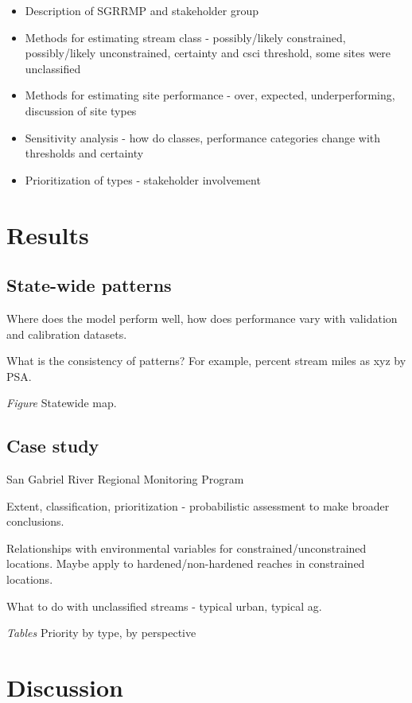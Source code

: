 \documentclass[]{article}
\begin{document}
\begin{itemize}
\item
  Description of SGRRMP and stakeholder group
\item
  Methods for estimating stream class - possibly/likely constrained,
  possibly/likely unconstrained, certainty and \ac{csci} threshold, some
  sites were unclassified
\item
  Methods for estimating site performance - over, expected,
  underperforming, discussion of site types
\item
  Sensitivity analysis - how do classes, performance categories change
  with thresholds and certainty
\item
  Prioritization of types - stakeholder involvement
\end{itemize}

\section{Results}\label{results}

\subsection{State-wide patterns}\label{state-wide-patterns}

Where does the model perform well, how does performance vary with
validation and calibration datasets.

What is the consistency of patterns? For example, percent stream miles
as xyz by PSA.

\emph{Figure} Statewide map.

\subsection{Case study}\label{case-study}

San Gabriel River Regional Monitoring Program

Extent, classification, prioritization - probabilistic assessment to
make broader conclusions.

Relationships with environmental variables for constrained/unconstrained
locations. Maybe apply to hardened/non-hardened reaches in constrained
locations.

What to do with unclassified streams - typical urban, typical ag.

\emph{Tables} Priority by type, by perspective

\section{Discussion}\label{discussion}
\end{document}

